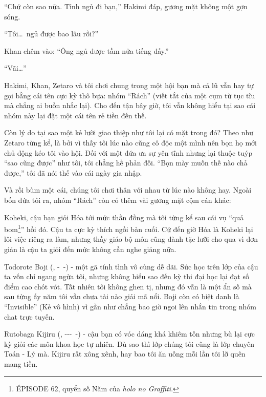\documentclass[../main.tex]{subfiles}
\begin{document}
``Chứ còn sao nữa. Tỉnh ngủ đi bạn,'' Hakimi đáp, gương mặt không một gợn sóng.

``Tôi\dots\ ngủ được bao lâu rồi?''

Khan chêm vào: ``Ông ngủ được tầm nửa tiếng đấy.''

``Vãi\dots''

Hakimi, Khan, Zetaro và tôi chơi chung trong một hội bạn mà cả lũ vẫn hay tự gọi bằng cái tên cực kỳ thô bựa: nhóm ``Rách'' (viết tắt của một cụm từ tục tĩu mà chẳng ai buồn nhắc lại). Cho đến tận bây giờ, tôi vẫn không hiểu tại sao cái nhóm này lại đặt một cái tên rẻ tiền đến thế.

Còn lý do tại sao một kẻ lười giao thiệp như tôi lại có mặt trong đó? Theo như Zetaro từng kể, là bởi vì thấy tôi lúc nào cũng cô độc một mình nên bọn họ mới chủ động kéo tôi vào hội. Đối với một đứa ưa sự yên tĩnh nhưng lại thuộc tuýp ``sao cũng được'' như tôi, tôi chẳng hề phản đối. ``Bọn mày muốn thế nào chả được,'' tôi đã nói thế vào cái ngày gia nhập.

Và rồi bùm một cái, chúng tôi chơi thân với nhau từ lúc nào không hay. Ngoài bốn đứa tôi ra, nhóm ``Rách'' còn có thêm vài gương mặt cộm cán khác:

Koheki, cậu bạn giỏi Hóa tới mức thần đồng mà tôi từng kể sau cái vụ ``quả bom\footnote{{\flaregothic ÉPISODE 62}, quyển số Năm của \textit{holo no Graffiti}.}'' hồi đó. Cậu ta cực kỳ thích ngồi bàn cuối. Cứ đến giờ Hóa là Koheki lại lôi việc riêng ra làm, nhưng thầy giáo bộ môn cũng đành tặc lưỡi cho qua vì đơn giản là cậu ta giỏi đến mức không cần nghe giảng nữa.

Todorote Boji (, -\ -) - một gã tính tình vô cùng dễ dãi. Sức học trên lớp của cậu ta vốn chỉ ngang ngửa tôi, nhưng không hiểu sao đến kỳ thi đại học lại đạt số điểm cao chót vót. Tất nhiên tôi không ghen tị, nhưng đó vẫn là một ẩn số mà sau từng ấy năm tôi vẫn chưa tài nào giải mã nổi. Boji còn có biệt danh là ``Invisible'' (Kẻ vô hình) vì gần như chẳng bao giờ ngoi lên nhắn tin trong nhóm chat trực tuyến.

Rutobaga Kijiru (, ---\ -) - cậu bạn có vóc dáng khá khiêm tốn nhưng bù lại cực kỳ giỏi các môn khoa học tự nhiên. Dù sao thì lớp chúng tôi cũng là lớp chuyên Toán - Lý mà. Kijiru rất xông xênh, hay bao tôi ăn uống mỗi lần tôi lỡ quên mang tiền.
\end{document}
